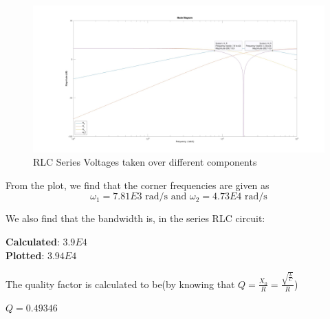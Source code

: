 
\begin{figure}[htbp]
    \centering
    \includegraphics[width=\textwidth]{images/parallel_RLC_series_plot.jpg}
    \caption{RLC Series Voltages taken over different components}
    \label{fig:prelab}
\end{figure}

From the plot, we find that the corner frequencies are given as
\begin{equation}
    \omega _1 = 7.81E3 \text{ rad/s} \text{ and } \omega _2 = 4.73E4 \text{ rad/s}
\end{equation}


We also find that the bandwidth is, in the series RLC circuit:

\begin{center}
    {\bf Calculated}: $3.9E4$
    \\
    {\bf Plotted}: $3.94E4$
\end{center}

The quality factor is calculated to be(by knowing that $Q = \frac{X_0}{R} = \frac{\sqrt{\frac{L}{C}}}{R}$)

\begin{center}
    \(Q=0.49346\)
\end{center}

